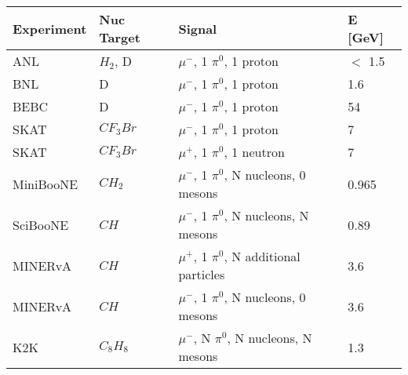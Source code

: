 \begin{table}[H]
 \centering
 \singlespacing
 \begin{tabular}{| l | l | l | l |}
  \hline
   Experiment & Nuc Target & Signal & E [GeV]\\ [0.1ex] \hline
 ANL \cite{bib:ANL1} & $H_2$, D & $\mu^-$, 1 $\pi^0$, 1 proton & $<$ 1.5 \\ 
 BNL \cite{bib:ANL2} & D & $\mu^-$, 1 $\pi^0$, 1 proton & 1.6 \\ 
 BEBC \cite{bib:HE_unknown1} & D & $\mu^-$, 1 $\pi^0$, 1 proton & 54 \\ 
 SKAT \cite{bib:HE_unknown2} & $CF_{3}Br$ & $\mu^-$, 1 $\pi^0$, 1 proton & 7 \\ 
 SKAT \cite{bib:HE_unknown2} & $CF_{3}Br$ & $\mu^+$, 1 $\pi^0$, 1 neutron & 7 \\ 
 MiniBooNE \cite{bib:miniboone_thesis} & $CH_2$ & $\mu^-$, 1 $\pi^0$, N nucleons, 0 mesons& 0.965 \\ 
 SciBooNE \cite{bib:sciboone_thesis} & $CH$ & $\mu^-$, 1 $\pi^0$, N nucleons, N mesons  & 0.89 \\
  MINERvA \cite{bib:minerva_thesis} & $CH$ & $\mu^+$, 1 $\pi^0$, N additional particles & 3.6 \\ 
  MINERvA \cite{bib:minerva_paper_2017} & $CH$ & $\mu^-$, 1 $\pi^0$, N nucleons, 0 mesons & 3.6 \\ 
 K2K \cite{bib:k2k_paper} & $C_{8}H_{8}$ & $\mu^-$, N $\pi^0$, N nucleons, N mesons& 1.3 \\ 
\hline
\end{tabular}
\end{table}

